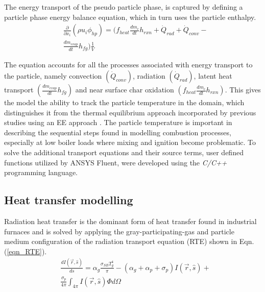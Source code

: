 \documentclass[twocolumn,10pt]{asme2ej}
\begin{document}
The energy transport of the pseudo particle phase, is captured by defining a particle phase energy balance equation, which in turn uses the particle enthalpy.
\begin{equation}\label{eqn_phi_hp}
\begin{split}
&\frac{\partial}{\partial x_{i}}( \rho u_{i} \phi_{hp} )=( f_{heat}\frac{dm_{c}}{dt}h_{rxn} + \dot{Q}_{rad} + \dot{Q}_{conv} -\\
&\frac{dm_{evap}}{dt}h_{fg}) \frac{1}{V} 
\end{split}
\end{equation}

The equation accounts for all the processes associated with energy transport to the particle, namely convection $\left(\dot{Q}_{conv}\right)$, radiation $\left(\dot{Q}_{rad}\right)$, latent heat transport $\left(\frac{dm_{evap}}{dt}h_{fg}\right)$ and near surface char oxidation $\left(f_{heat}\frac{dm_{c}}{dt}h_{rxn}\right)$. This gives the model the ability to track the particle temperature in the domain, which distinguishes it from the thermal equilibrium approach incorporated by previous studies using an EE approach \cite{Benim2005, Vicente2003, Cai2015}. The particle temperature is important in describing the sequential steps found in modelling combustion processes, especially at low boiler loads where mixing and ignition become problematic. To solve the additional transport equations and their source terms, user defined functions utilized by ANSYS Fluent, were developed using the \textit{C/C++} programming language.

\subsection{Heat transfer modelling}
Radiation heat transfer is the dominant form of heat transfer found in industrial furnaces \cite{Basu2000} and is solved by applying the gray-participating-gas and particle medium configuration of the radiation transport equation (RTE) \cite{Modest2013} shown in Eqn. (\ref{eqn_RTE}).
\begin{equation}\label{eqn_RTE}
\begin{split}
&\frac{d I(\vec{r},\hat{s})}{ds} = \alpha_g \frac{\sigma_{SB} T_{g}^4}{\pi}-(\alpha_g+\alpha_p+\sigma_p)I(\vec{r},\hat{s}) + \\
&\frac{\sigma_p}{4\pi}\int_{4\pi}I(\vec{r},\hat{s})\Phi d \Omega
\end{split}
\end{equation}
\end{document}

